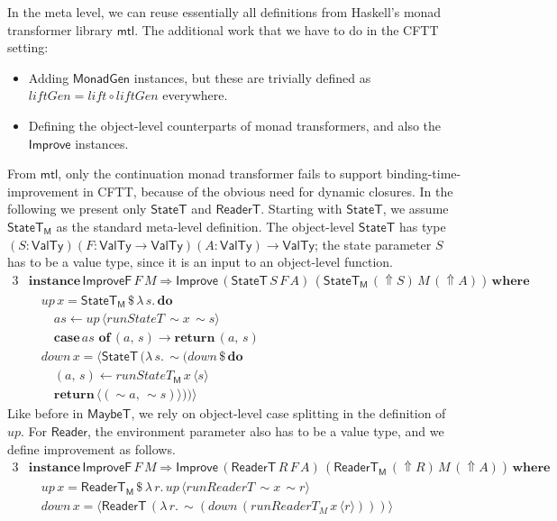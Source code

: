 \documentclass[acmsmall,screen,review,anonymous]{acmart}
\newcommand{\mit}[1]{\mathit{#1}}
\newcommand{\msf}[1]{\mathsf{#1}}
\newcommand{\mbf}[1]{\mathbf{#1}}
\newcommand{\bs}[1]{\boldsymbol{#1}}
\newcommand{\mdo}{\mbf{do}\,}
\newcommand{\ind}{\hspace{1em}}
\newcommand{\return}{\mbf{return}\,}
\newcommand{\lam}{\lambda\,}
\newcommand{\where}{\mbf{where}}
\newcommand{\M}{\msf{M}}
\newcommand{\of}{\mbf{of}\,}
\newcommand{\Reader}{\msf{Reader}}
\newcommand{\ReaderT}{\msf{ReaderT}}
\newcommand{\fro}{\leftarrow}
\newcommand{\case}{\mbf{case\,}}
\newcommand{\Up}{{\Uparrow}}
\newcommand{\spl}{{\bs{\sim}}}
\newcommand{\ql}{{\bs{\langle}}}
\newcommand{\qr}{{\bs{\rangle}}}
\newcommand{\VTy}{\msf{ValTy}}
\newcommand{\MaybeT}{\msf{MaybeT}}
\theoremstyle{remark}
\newcommand{\mup}{\mit{up}}
\newcommand{\mdown}{\mit{down}}
\newcommand{\instance}{\mbf{instance}\,}
\newcommand{\Improve}{\msf{Improve}}
\newcommand{\qt}[1]{\ql#1\qr}
\newcommand{\lift}{\mit{lift}}
\newcommand{\liftGen}{\mit{liftGen}}
\newcommand{\MonadGen}{\msf{MonadGen}}
\newcommand{\RA}{\Rightarrow}
\newcommand{\StateT}{\msf{StateT}}
\newcommand{\runReaderT}{\mit{runReaderT}}
\newcommand{\runStateT}{\mit{runStateT}}
\newcommand{\dlr}{\,\$\,}
\newcommand{\ImproveF}{\msf{ImproveF}}
\begin{document}
In the meta level, we can reuse essentially all definitions from Haskell's
monad transformer library $\msf{mtl}$. The additional work that we have to do in
the CFTT setting:
\begin{itemize}
  \item Adding $\MonadGen$ instances, but these are trivially defined as
        $\liftGen = \lift \circ \liftGen$ everywhere.
  \item Defining the object-level counterparts of monad transformers, and
        also the $\Improve$ instances.
\end{itemize}
From $\msf{mtl}$, only the continuation monad transformer fails to support
binding-time-improvement in CFTT, because of the obvious need for dynamic
closures. In the following we present only $\StateT$ and $\ReaderT$. Starting
with $\StateT$, we assume $\StateT_\M$ as the standard meta-level definition.
The object-level $\StateT$ has type $(S : \VTy)(F : \VTy \to \VTy)(A : \VTy) \to
\VTy$; the state parameter $S$ has to be a value type, since it is an input to
an object-level function.
\begin{alignat*}{3}
  &\instance \ImproveF\,F\,M \RA \Improve\,(\StateT\,S\,F\,A)\,(\StateT_\M\,(\Up S)\,M\,(\Up A))\,\where\\
  &\ind \mup\,x = \StateT_\M \dlr \lam s.\,\mdo\\
  &\ind\ind \mit{as} \fro \mup\,\qt{\runStateT\,\spl x\,\spl s}\\
  &\ind\ind \case \mit{as}\,\,\of (a,\,s) \to \return (a,\,s)\\
  &\ind \mdown\,x = \qt{ \StateT\,(\lam s.\, \spl(\mdown \dlr \mdo\\\
  &\ind \ind (a,\,s) \fro \runStateT_\M\,x\,\qt{s}\\
  &\ind \ind \return \qt{(\spl a,\, \spl s)}))}
\end{alignat*}
Like before in $\MaybeT$, we rely on object-level case splitting in the
definition of $\mup$. For $\Reader$, the environment parameter also has to be a
value type, and we define improvement as follows.
\begin{alignat*}{3}
  &\instance \ImproveF\,F\,M \RA \Improve\,(\ReaderT\,R\,F\,A)\,(\ReaderT_\M\,(\Up R)\,M\,(\Up A))\,\where\\
  &\ind \mup\,x   = \ReaderT_\M \dlr \lam r.\, \mup\,\qt{\runReaderT\,\spl x\,\spl r}\\
  &\ind \mdown\,x = \qt{\ReaderT\,(\lam r.\,\spl(\mdown\,(\runReaderT_M\,x\,\qt{r})))}
\end{alignat*}
\end{document}
